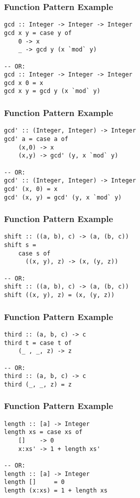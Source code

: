 \documentclass[dvipsnames]{beamer}
\theoremstyle{plain}
\begin{document}
\begin{frame}[fragile]
  \frametitle{Function Pattern Example}

  \begin{lstlisting}
gcd :: Integer -> Integer -> Integer
gcd x y = case y of
    0 -> x
    _ -> gcd y (x `mod` y)

-- OR:
gcd :: Integer -> Integer -> Integer
gcd x 0 = x
gcd x y = gcd y (x `mod` y)
  \end{lstlisting}
\end{frame}

\begin{frame}[fragile]
  \frametitle{Function Pattern Example}

  \begin{lstlisting}
gcd' :: (Integer, Integer) -> Integer
gcd' a = case a of
    (x,0) -> x
    (x,y) -> gcd' (y, x `mod` y)

-- OR:
gcd' :: (Integer, Integer) -> Integer
gcd' (x, 0) = x
gcd' (x, y) = gcd' (y, x `mod` y)
  \end{lstlisting}
\end{frame}

\begin{frame}[fragile]
  \frametitle{Function Pattern Example}

  \begin{lstlisting}
shift :: ((a, b), c) -> (a, (b, c))
shift s =
    case s of
      ((x, y), z) -> (x, (y, z))

-- OR:
shift :: ((a, b), c) -> (a, (b, c))
shift ((x, y), z) = (x, (y, z))
  \end{lstlisting}
\end{frame}

\begin{frame}[fragile]
  \frametitle{Function Pattern Example}

  \begin{lstlisting}
third :: (a, b, c) -> c
third t = case t of
    (_ , _, z) -> z

-- OR:
third :: (a, b, c) -> c
third (_, _, z) = z
  \end{lstlisting}
\end{frame}

\begin{frame}[fragile]
  \frametitle{Function Pattern Example}

  \begin{lstlisting}[deletekeywords={length}]
length :: [a] -> Integer
length xs = case xs of
    []    -> 0
    x:xs' -> 1 + length xs'

-- OR:
length :: [a] -> Integer
length []     = 0
length (x:xs) = 1 + length xs
  \end{lstlisting}
\end{frame}
\end{document}
